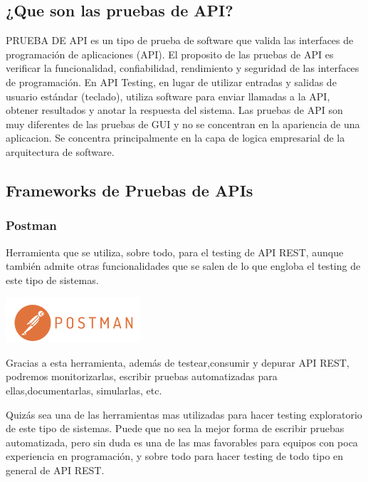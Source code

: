 \documentclass{article}
\begin{document}
\begin{multicols}{2}
\subsection{¿Que son las pruebas de API?}
PRUEBA DE API es un tipo de prueba de software que valida las interfaces de programación de aplicaciones (API). El proposito de las pruebas de API es verificar la funcionalidad, confiabilidad, rendimiento y seguridad de las interfaces de programación. En API Testing, en lugar de utilizar entradas y salidas de usuario estándar (teclado), utiliza software para enviar llamadas a la API, obtener resultados y anotar la respuesta del sistema. Las pruebas de API son muy diferentes de las pruebas de GUI y no se concentran en la apariencia de una aplicacion. Se concentra principalmente en la capa de logica empresarial de la arquitectura de software.

\subsection{Frameworks de Pruebas de APIs}
\subsubsection{Postman}

Herramienta que se utiliza, sobre todo, para el testing de API REST, aunque también admite otras funcionalidades que se salen de lo que engloba el testing de este tipo de sistemas.
\begin{center}
    \includegraphics[width=5cm]{Imagenes/postman.png}
\end{center}
Gracias a esta herramienta, además de testear,consumir y depurar API REST, podremos monitorizarlas, escribir pruebas automatizadas para ellas,documentarlas, simularlas, etc.

Quizás sea una de las herramientas mas utilizadas para hacer testing exploratorio de este tipo de sistemas. Puede que no sea la mejor forma de escribir pruebas automatizada, pero sin duda es una de las mas favorables para equipos con poca experiencia en programación, y sobre todo para hacer testing de todo tipo en general de API REST.


\end{multicols}
\end{document}
